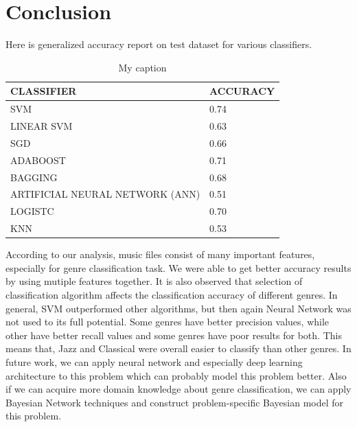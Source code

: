 \documentclass[conference]{IEEEtran}
\begin{document}
\section{Conclusion}
Here is generalized accuracy report on test dataset for various classifiers.
\begin{table}[H]
\centering
\caption{My caption}
\label{my-label}
\begin{tabular}{ll}
\hline
\textbf{CLASSIFIER}                  & \textbf{ACCURACY}         \\ \hline
\multicolumn{1}{|l|}{SVM}            & \multicolumn{1}{l|}{0.74} \\ \hline
\multicolumn{1}{|l|}{LINEAR SVM}     & \multicolumn{1}{l|}{0.63} \\ \hline
\multicolumn{1}{|l|}{SGD}            & \multicolumn{1}{l|}{0.66} \\ \hline
\multicolumn{1}{|l|}{ADABOOST}       & \multicolumn{1}{l|}{0.71} \\ \hline
\multicolumn{1}{|l|}{BAGGING}        & \multicolumn{1}{l|}{0.68} \\ \hline
\multicolumn{1}{|l|}{ARTIFICIAL NEURAL NETWORK (ANN) } & \multicolumn{1}{l|}{0.51} \\ \hline
\multicolumn{1}{|l|}{LOGISTC}        & \multicolumn{1}{l|}{0.70} \\ \hline
\multicolumn{1}{|l|}{KNN}            & \multicolumn{1}{l|}{0.53} \\ \hline
\end{tabular}
\end{table}

According to our analysis, music files consist of many important features, especially for genre classification task. We were able to get better accuracy results by using mutiple features together. It is also observed that selection of classification algorithm affects the classification accuracy of different genres. In general, SVM outperformed other algorithms, but then again Neural Network was not used to its full potential. Some genres have better precision values, while other have better recall values and some genres have poor results for both. This means that, Jazz and Classical were overall easier to classify than other genres. In future work, we can apply neural network and especially deep learning architecture to this problem which can probably model this problem better. Also if we can acquire more domain knowledge about genre classification, we can apply Bayesian Network techniques and construct problem-specific Bayesian model for this problem.
\end{document}
